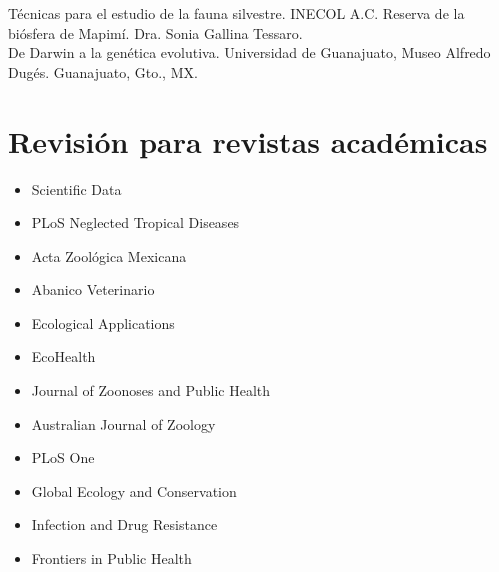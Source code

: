 \documentclass[11pt, letter]{article}
\newcommand{\years}[1]{\marginnote{\scriptsize #1}}
\begin{document}
\years{2008} T\'ecnicas para el estudio de la fauna silvestre. INECOL A.C. Reserva de la bi\'osfera de Mapim\'i. Dra. Sonia Gallina Tessaro.\\

\years{2006} De Darwin a la gen\'etica evolutiva. Universidad de Guanajuato, Museo Alfredo Dug\'es. Guanajuato, Gto., MX.

\section*{Revisi\'on para revistas acad\'emicas}

\begin{itemize}
 \item Scientific Data
 \item PLoS Neglected Tropical Diseases
 \item Acta Zool\'ogica Mexicana
 \item Abanico Veterinario
 \item Ecological Applications
 \item EcoHealth
 \item Journal of Zoonoses and Public Health
 \item Australian Journal of Zoology
 \item PLoS One
 \item Global Ecology and Conservation
 \item Infection and Drug Resistance
 \item Frontiers in Public Health
\end{itemize}
\end{document}
